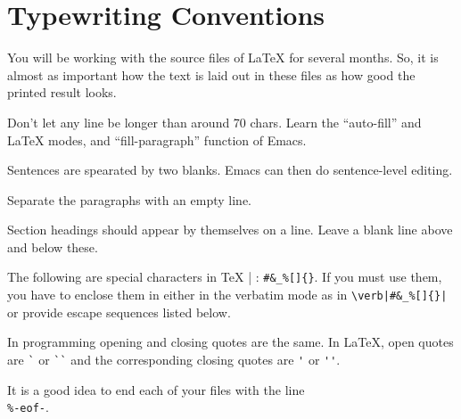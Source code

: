 \chapter{Typewriting Conventions}

You will be working with the source files of LaTeX for several months.
So, it is almost as important how the text is laid out in these files
as how good the printed result looks.

Don't let any line be longer than around 70 chars.  Learn the
``auto-fill'' and LaTeX modes, and ``fill-paragraph'' function of
Emacs.

Sentences are spearated by two blanks.  Emacs can then do
sentence-level editing.

Separate the paragraphs with an empty line.

Section headings should appear by themselves on a line.  Leave a blank
line above and below these.

The following are special characters in {\TeX} | : \verb|#&_%[]{}|.
If you must use them, you have to enclose them in either in the
verbatim mode as in \verb/\verb|#&_%[]{}|/ or provide escape sequences
listed below.

In programming opening and closing quotes are the same.  In \LaTeX{},
open quotes are \verb|`| or \verb|``| and the corresponding closing
quotes are \verb|'| or \verb|''|.

It is a good idea to end each of your files with the line \\
\verb|%-eof-|.


